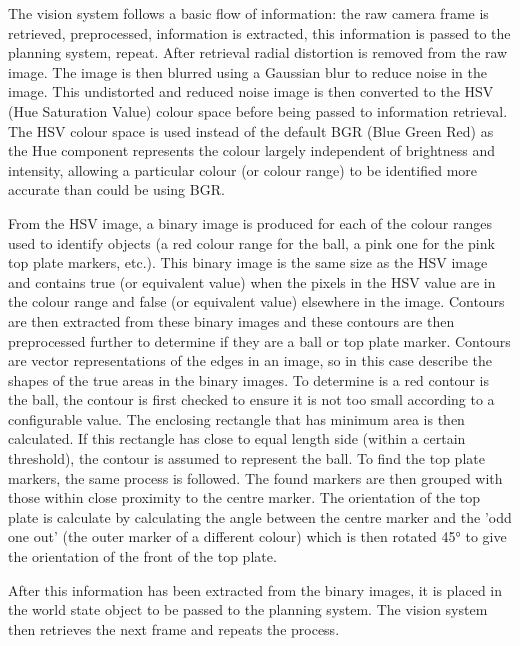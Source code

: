 The vision system follows a basic flow of information: the raw camera frame is
retrieved, preprocessed, information is extracted, this information is passed
to the planning system, repeat. After retrieval radial distortion is removed
from the raw image. The image is then blurred using a Gaussian blur to reduce
noise in the image. This undistorted and reduced noise image is then converted
to the HSV (Hue Saturation Value) colour space before being passed to
information retrieval. The HSV colour space is used instead of the default BGR
(Blue Green Red) as the Hue component represents the colour largely independent
of brightness and intensity, allowing a particular colour (or colour range) to
be identified more accurate than could be using BGR.

From the HSV image, a binary image is produced for each of the colour ranges
used to identify objects (a red colour range for the ball, a pink one for the
pink top plate markers, etc.). This binary image is the same size as the HSV
image and contains true (or equivalent value) when the pixels in the HSV value
are in the colour range and false (or equivalent value) elsewhere in the image.
Contours are then extracted from these binary images and these contours are
then preprocessed further to determine if they are a ball or top plate marker.
Contours are vector representations of the edges in an image, so in this case
describe the shapes of the true areas in the binary images. To determine is a
red contour is the ball, the contour is first checked to ensure it is not too
small according to a configurable value. The enclosing rectangle that has
minimum area is then calculated. If this rectangle has close to equal length
side (within a certain threshold), the contour is assumed to represent the
ball. To find the top plate markers, the same process is followed. The found
markers are then grouped with those within close proximity to the centre
marker. The orientation of the top plate is calculate by calculating the angle
between the centre marker and the 'odd one out' (the outer marker of a
different colour) which is then rotated 45° to give the orientation of the
front of the top plate.

After this information has been extracted from the binary images, it is placed
in the world state object to be passed to the planning system. The vision
system then retrieves the next frame and repeats the process.


